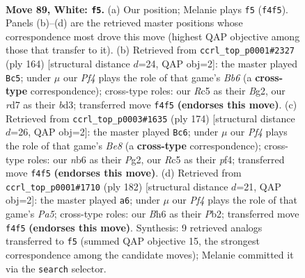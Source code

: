 \documentclass[11pt]{article}
\begin{document}
\clearpage

\begin{figure}[p]\centering
\begin{subfigure}{0.46\textwidth}\centering
\resizebox{\linewidth}{!}{%
\newchessgame
\chessboard[
  setfen={6k1/3r4/1n5B/2R5/p4P1P/P7/7K/8 w - - 3 89},
  showmover=false,
  pgfstyle=straightmove, color=movearrow, markmove={f4-f5}
]}
\caption{}
\end{subfigure}\hfill
\begin{subfigure}{0.46\textwidth}\centering
\resizebox{\linewidth}{!}{%
\newchessgame
\chessboard[
  setfen={8/3k3p/1B6/P3n1P1/7K/3b4/6B1/8 w - - 5 83},
  showmover=false,
  pgfstyle=straightmove, color=movearrow, markmove={b6-c5}
]}
\caption{}
\end{subfigure}
\\[4pt]
\begin{subfigure}{0.46\textwidth}\centering
\resizebox{\linewidth}{!}{%
\newchessgame
\chessboard[
  setfen={4B3/8/1b6/1P6/5p1p/2k4P/6P1/2K5 w - - 50 88},
  showmover=false,
  pgfstyle=straightmove, color=movearrow, markmove={e8-c6}
]}
\caption{}
\end{subfigure}\hfill
\begin{subfigure}{0.46\textwidth}\centering
\resizebox{\linewidth}{!}{%
\newchessgame
\chessboard[
  setfen={8/2R5/3p4/P2P1n2/5k2/6r1/KP6/8 w - - 2 92},
  showmover=false,
  pgfstyle=straightmove, color=movearrow, markmove={a5-a6}
]}
\caption{}
\end{subfigure}
\caption{\textbf{Move 89, White: \texttt{f5}.} (a) Our position; Melanie plays \texttt{f5} (\texttt{f4f5}). Panels (b)--(d) are the retrieved master positions whose correspondence most drove this move (highest QAP objective among those that transfer to it). (b) Retrieved from \texttt{ccrl\_top\_p0001\#2327} (ply 164) [structural distance $d$=24, QAP obj=2]: the master played \texttt{Bc5}; under $\mu$ our \emph{Pf4} plays the role of that game's \emph{Bb6} (a \textbf{cross-type} correspondence); cross-type roles: our \emph{R}c5 as their \emph{B}g2, our \emph{r}d7 as their \emph{b}d3; transferred move \texttt{f4f5} \textbf{(endorses this move)}. (c) Retrieved from \texttt{ccrl\_top\_p0003\#1635} (ply 174) [structural distance $d$=26, QAP obj=2]: the master played \texttt{Bc6}; under $\mu$ our \emph{Pf4} plays the role of that game's \emph{Be8} (a \textbf{cross-type} correspondence); cross-type roles: our \emph{n}b6 as their \emph{P}g2, our \emph{R}c5 as their \emph{p}f4; transferred move \texttt{f4f5} \textbf{(endorses this move)}. (d) Retrieved from \texttt{ccrl\_top\_p0001\#1710} (ply 182) [structural distance $d$=21, QAP obj=2]: the master played \texttt{a6}; under $\mu$ our \emph{Pf4} plays the role of that game's \emph{Pa5}; cross-type roles: our \emph{B}h6 as their \emph{P}b2; transferred move \texttt{f4f5} \textbf{(endorses this move)}. Synthesis: 9 retrieved analogs transferred to \texttt{f5} (summed QAP objective 15, the strongest correspondence among the candidate moves); Melanie committed it via the \texttt{search} selector.}
\label{fig:thought-m176}
\end{figure}
\end{document}
